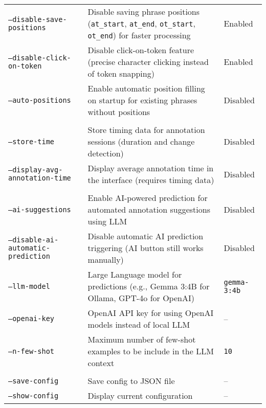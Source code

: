 \begin{tabular}{@{}l p{9cm} p{8cm}@{}}
\texttt{--disable-save-positions} & Disable saving phrase positions (\texttt{at\_start}, \texttt{at\_end}, \texttt{ot\_start}, \texttt{ot\_end}) for faster processing & Enabled \\
\texttt{--disable-click-on-token} & Disable click-on-token feature (precise character clicking instead of token snapping) & Enabled \\
\rowcolor{gray!5}
\texttt{--auto-positions} & Enable automatic position filling on startup for existing phrases without positions & Disabled \\
\addlinespace[0.3em]
\hline
\multicolumn{3}{@{}l}{\textit{Analytics and Timing}} \\
\addlinespace[0.2em]
\texttt{--store-time} & Store timing data for annotation sessions (duration and change detection) & Disabled \\
\rowcolor{gray!5}
\texttt{--display-avg-annotation-time} & Display average annotation time in the interface (requires timing data) & Disabled \\
\addlinespace[0.3em]
\hline
\multicolumn{3}{@{}l}{\textit{AI Integration}} \\
\addlinespace[0.2em]
\rowcolor{gray!5}
\texttt{--ai-suggestions} & Enable AI-powered prediction for automated annotation suggestions using LLM & Disabled \\
\texttt{--disable-ai-automatic-prediction} & Disable automatic AI prediction triggering (AI button still works manually) & Disabled \\
\rowcolor{gray!5}
\texttt{--llm-model} & Large Language model for predictions (e.g., Gemma 3:4B for Ollama, GPT-4o for OpenAI) & \texttt{gemma-3:4b} \\
\texttt{--openai-key} & OpenAI API key for using OpenAI models instead of local LLM & -- \\
\rowcolor{gray!5}
\texttt{--n-few-shot} & Maximum number of few-shot examples to be include in the LLM context & \texttt{10} \\
\addlinespace[0.3em]
\hline
\multicolumn{3}{@{}l}{\textit{Configuration Management}} \\
\addlinespace[0.2em]
\texttt{--save-config} & Save config to JSON file & -- \\
\rowcolor{gray!5}
\texttt{--show-config} & Display current configuration & -- \\
\bottomrule
\end{tabular}